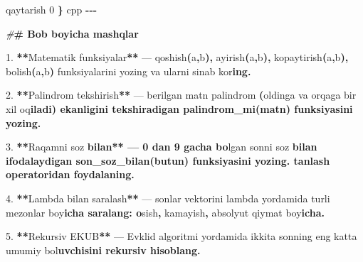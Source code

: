 \documentclass[a4paper,11pt,twoside,openright]{book}
\newenvironment{Shaded}{\begin{snugshade}}{\end{snugshade}}
\newcommand{\CharTok}[1]{\textcolor[rgb]{0.31,0.60,0.02}{#1}}
\newcommand{\DecValTok}[1]{\textcolor[rgb]{0.00,0.00,0.81}{#1}}
\newcommand{\ErrorTok}[1]{\textcolor[rgb]{0.64,0.00,0.00}{\textbf{#1}}}
\newcommand{\FloatTok}[1]{\textcolor[rgb]{0.00,0.00,0.81}{#1}}
\newcommand{\NormalTok}[1]{#1}
\newcommand{\OperatorTok}[1]{\textcolor[rgb]{0.81,0.36,0.00}{\textbf{#1}}}
\newcommand{\PreprocessorTok}[1]{\textcolor[rgb]{0.56,0.35,0.01}{\textit{#1}}}
\begin{document}
\begin{Shaded}
\begin{Highlighting}[]
\NormalTok{    qaytarish }\DecValTok{0}
\OperatorTok{\}}
\ErrorTok{\textasciigrave{}\textasciigrave{}\textasciigrave{}}\NormalTok{cpp}
\OperatorTok{{-}{-}{-}}

\PreprocessorTok{\#}\ErrorTok{\# Bob bo\textquotesingle{}yicha mashqlar}

\FloatTok{1.} \OperatorTok{**}\NormalTok{Matematik funksiyalar}\OperatorTok{**}\NormalTok{ — }\ErrorTok{\textasciigrave{}}\NormalTok{qoshish}\OperatorTok{(}\NormalTok{a}\OperatorTok{,}\NormalTok{b}\OperatorTok{)}\ErrorTok{\textasciigrave{}}\OperatorTok{,} \ErrorTok{\textasciigrave{}}\NormalTok{ayirish}\OperatorTok{(}\NormalTok{a}\OperatorTok{,}\NormalTok{b}\OperatorTok{)}\ErrorTok{\textasciigrave{}}\OperatorTok{,} \ErrorTok{\textasciigrave{}}\NormalTok{kopaytirish}\OperatorTok{(}\NormalTok{a}\OperatorTok{,}\NormalTok{b}\OperatorTok{)}\ErrorTok{\textasciigrave{}}\OperatorTok{,} \ErrorTok{\textasciigrave{}}\NormalTok{bolish}\OperatorTok{(}\NormalTok{a}\OperatorTok{,}\NormalTok{b}\OperatorTok{)}\ErrorTok{\textasciigrave{}}\NormalTok{ funksiyalarini yozing va ularni sinab ko}\CharTok{\textquotesingle{}r}\ErrorTok{ing.}

\FloatTok{2.} \OperatorTok{**}\NormalTok{Palindrom tekshirish}\OperatorTok{**}\NormalTok{ — berilgan matn palindrom }\OperatorTok{(}\NormalTok{oldinga va orqaga bir xil o}\CharTok{\textquotesingle{}q}\ErrorTok{iladi) ekanligini tekshiradigan \textasciigrave{}palindrom\_mi(matn)\textasciigrave{} funksiyasini yozing.}

\FloatTok{3.} \OperatorTok{**}\NormalTok{Raqamni so}\CharTok{\textquotesingle{}z}\ErrorTok{ bilan** — 0 dan 9 gacha bo}\CharTok{\textquotesingle{}}\NormalTok{lgan sonni so}\CharTok{\textquotesingle{}z}\ErrorTok{ bilan ifodalaydigan \textasciigrave{}son\_soz\_bilan(butun)\textasciigrave{} funksiyasini yozing. \textasciigrave{}tanlash\textasciigrave{} operatoridan foydalaning.}

\FloatTok{4.} \OperatorTok{**}\NormalTok{Lambda bilan saralash}\OperatorTok{**}\NormalTok{ — sonlar vektorini lambda yordamida turli mezonlar bo}\CharTok{\textquotesingle{}y}\ErrorTok{icha saralang: o}\CharTok{\textquotesingle{}}\NormalTok{sish}\OperatorTok{,}\NormalTok{ kamayish}\OperatorTok{,}\NormalTok{ absolyut qiymat bo}\CharTok{\textquotesingle{}y}\ErrorTok{icha.}

\FloatTok{5.} \OperatorTok{**}\NormalTok{Rekursiv EKUB}\OperatorTok{**}\NormalTok{ — Evklid algoritmi yordamida ikkita sonning eng katta umumiy bo}\CharTok{\textquotesingle{}l}\ErrorTok{uvchisini rekursiv hisoblang.}


\end{Highlighting}
\end{Shaded}
\end{document}
